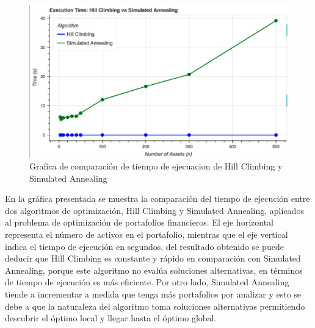 \documentclass[9pt,a4paper,twoside]{rho-class/rho}
\begin{document}
        \begin{figure}[h]
            \centering
            \includegraphics[width=\linewidth]{figures/exe_time.pdf}
            \caption{Grafica de comparación de tiempo de ejecuacion de Hill Climbing y Simulated Annealing}
            \label{fig:sample_figure}
        \end{figure}
        
        En la gráfica presentada se muestra la comparación del tiempo de ejecución entre dos algoritmos de optimización, Hill Climbing y Simulated Annealing, aplicados al problema de optimización de portafolios financieros. El eje horizontal representa el número de activos en el portafolio, mientras que el eje vertical indica el tiempo de ejecución en segundos, del resultado obtenido se puede deducir que Hill Climbing es constante y rápido en comparación con Simulated Annealing, porque este algoritmo no evalúa soluciones alternativas, en términos de tiempo de ejecución es más eficiente. Por otro lado, Simulated Annealing tiende a incrementar a medida que tenga más portafolios por analizar y esto se debe a que la naturaleza del algoritmo toma soluciones alternativas permitiendo descubrir el óptimo local y llegar hasta el óptimo global.


\end{document}
